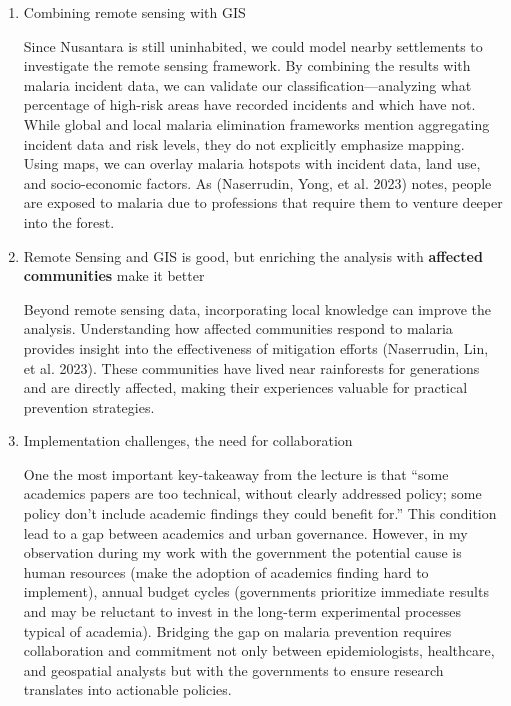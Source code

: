 \documentclass[
  letterpaper,
  DIV=11,
  numbers=noendperiod]{scrreprt}
\begin{document}
\begin{enumerate}
\def\labelenumi{\arabic{enumi}.}
\item
  Combining remote sensing with GIS

  Since Nusantara is still uninhabited, we could model nearby
  settlements to investigate the remote sensing framework. By combining
  the results with malaria incident data, we can validate our
  classification---analyzing what percentage of high-risk areas have
  recorded incidents and which have not. While global and local malaria
  elimination frameworks mention aggregating incident data and risk
  levels, they do not explicitly emphasize mapping. Using maps, we can
  overlay malaria hotspots with incident data, land use, and
  socio-economic factors. As (Naserrudin, Yong, et al. 2023) notes,
  people are exposed to malaria due to professions that require them to
  venture deeper into the forest.
\item
  Remote Sensing and GIS is good, but enriching the analysis with
  \textbf{affected communities} make it better

  Beyond remote sensing data, incorporating local knowledge can improve
  the analysis. Understanding how affected communities respond to
  malaria provides insight into the effectiveness of mitigation efforts
  (Naserrudin, Lin, et al. 2023). These communities have lived near
  rainforests for generations and are directly affected, making their
  experiences valuable for practical prevention strategies.
\item
  Implementation challenges, the need for collaboration

  One the most important key-takeaway from the lecture is that ``some
  academics papers are too technical, without clearly addressed policy;
  some policy don't include academic findings they could benefit for.''
  This condition lead to a gap between academics and urban governance.
  However, in my observation during my work with the government the
  potential cause is human resources (make the adoption of academics
  finding hard to implement), annual budget cycles (governments
  prioritize immediate results and may be reluctant to invest in the
  long-term experimental processes typical of academia). Bridging the
  gap on malaria prevention requires collaboration and commitment not
  only between epidemiologists, healthcare, and geospatial analysts but
  with the governments to ensure research translates into actionable
  policies.
\end{enumerate}
\end{document}

